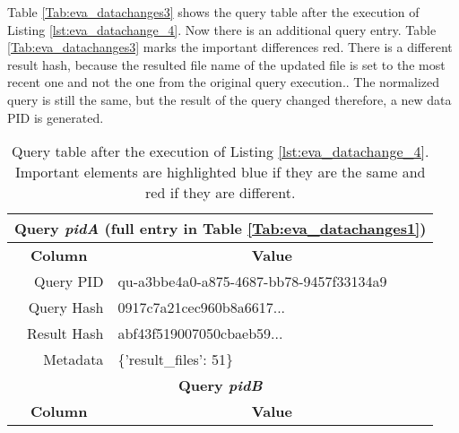 \documentclass[draft,final]{vutinfth} %
\newenvironment{code}{\captionsetup{type=listing}}{}
\begin{document}
\begin{enumerate}
	\newpage
	Table \ref{Tab:eva_datachanges3} shows the query table after the execution of Listing \ref{lst:eva_datachange_4}. Now there is an additional query entry. Table \ref{Tab:eva_datachanges3} marks the important differences red. There is a different result hash, because the {resulted file name of the updated file is set to the most recent one and not the one from the original query execution.}. The normalized query is still the same, but the result of the query changed therefore, a new data PID is generated. 
	\begin{table}[]
		\caption{Query table after the execution of Listing \ref{lst:eva_datachange_4}. Important elements are highlighted blue if they are the same and red if they are different.}
		\centering
		\begin{tabular}{|r|l|}
			\hline \multicolumn{2}{|c|}{\textbf{Query \textit{pidA} (full entry in Table \ref{Tab:eva_datachanges1})}} \\
			\hline \multicolumn{1}{|c|}{\textbf{Column}}  &  \multicolumn{1}{c|}{\textbf{Value}} \\ \hline
			Query PID & {\color{red}qu-a3bbe4a0-a875-4687-bb78-9457f33134a9}  \\ 
			Query Hash & {\color{blue}0917c7a21cec960b8a6617...}  \\
			Result Hash & {\color{red}abf43f519007050cbaeb59...}   \\
			Metadata & \{'result\_files': 51\}  \\
			\hline \multicolumn{2}{|c|}{\textbf{Query \textit{pidB}}} \\
			\hline \multicolumn{1}{|c|}{\textbf{Column}}  &  \multicolumn{1}{c|}{\textbf{Value}} \\ \hline

\end{tabular}
\end{table}
\end{enumerate}
\end{document}
